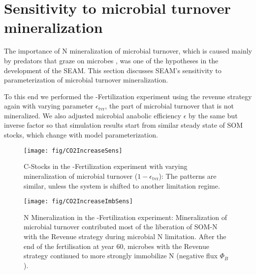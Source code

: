 \section{Sensitivity to microbial turnover mineralization \label{app:TvrSens}}

The importance of N mineralization of microbial turnover, which is caused mainly
by predators that graze on microbes \citep{Clarholm85, Raynaud06}, was one of
the hypotheses in the development of the SEAM.
This section discusses SEAM's sensitivity to parameterization of microbial
turnover mineralization.

To this end we performed the -Fertilization experiment using the
revenue strategy again with varying parameter $\epsilon_{\operatorname{tvr}}$,
the part of microbial turnover that is not mineralized. We also adjusted
microbial anabolic efficiency $\epsilon$ by the same but inverse factor so that
simulation results start from similar steady state of SOM stocks,
which change with model parameterization.

\begin{figure}[t] \vspace*{2mm}
\begin{center}
\texttt{[image: fig/CO2IncreaseSens]}
\end{center}
\caption{
C-Stocks in the -Fertilization experiment with varying
mineralization of microbial turnover ($1-\epsilon_{\operatorname{tvr}}$): The
patterns are similar, unless the system is shifted to another limitation regime.
\label{fig:CO2IncreaseSens}}

\end{figure}
\begin{figure}[t] \vspace*{2mm}
\begin{center}
\texttt{[image: fig/CO2IncreaseImbSens]} 
\end{center}
\caption{
N Mineralization in the -Fertilization experiment:
Mineralization of microbial turnover contributed most of the liberation of SOM-N
with the Revenue strategy during microbial N limitation.
After the end of the fertilisation at year 60, microbes with the Revenue
strategy continued to more strongly immobilize N (negative flux $\Phi_B$).
\label{fig:CO2IncreaseImbSens}}
\end{figure}

